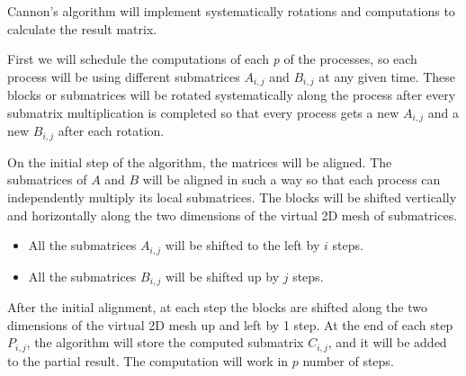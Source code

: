 \documentclass{article}
\begin{document}
Cannon's algorithm will implement systematically rotations and computations to calculate the result matrix.

First we will schedule the computations of each \textit{p} of the processes, so each process will be using different submatrices $A_{i,j}$ and $B_{i,j}$ at any given time. These blocks or submatrices will be rotated systematically along the process after every submatrix multiplication is completed so that every process gets a new $A_{i,j}$ and a new $B_{i,j}$ after each rotation.

On the initial step of the algorithm, the matrices will be aligned. The submatrices of $A$ and $B$ will be aligned in such a way so that each process can independently multiply its local submatrices. The blocks will be shifted vertically and horizontally along the two dimensions of the virtual 2D mesh of submatrices.

\begin{itemize}
 \item All the submatrices $A_{i,j}$ will be shifted to the left by $i$ steps. 
 \item All the submatrices $B_{i,j}$ will be shifted up by $j$ steps.
\end{itemize}

After the initial alignment, at each step the blocks are shifted along the two dimensions of the virtual 2D mesh up and left by 1 step. At the end of each step $P_{i,j}$, the algorithm will store the computed submatrix $C_{i,j}$, and it will be added to the partial result. The computation will work in $p$ number of steps. 
\end{document}
